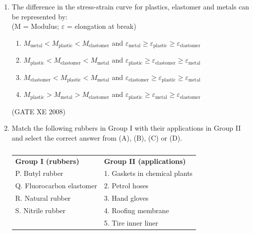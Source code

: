\documentclass[12pt]{article}
\begin{document}
\begin{enumerate}
\begin{enumerate}
\end{enumerate}

(GATE XE 2008)

\item The difference in the stress-strain curve for plastics, elastomer and metals can be represented by: \\
(M = Modulus; $\varepsilon$ = elongation at break)

\begin{enumerate}
\item  $M_{\text{metal}} < M_{\text{plastic}} < M_{\text{elastomer}}$ and $\varepsilon_{\text{metal}} \geq \varepsilon_{\text{plastic}} \geq \varepsilon_{\text{elastomer}}$ 
\item  $M_{\text{plastic}} < M_{\text{elastomer}} < M_{\text{metal}}$ and $\varepsilon_{\text{plastic}} \geq \varepsilon_{\text{elastomer}} \geq \varepsilon_{\text{metal}}$ 
\item  $M_{\text{elastomer}} < M_{\text{plastic}} < M_{\text{metal}}$ and $\varepsilon_{\text{elastomer}} \geq \varepsilon_{\text{plastic}} \geq \varepsilon_{\text{metal}}$ 
\item  $M_{\text{plastic}} > M_{\text{metal}} > M_{\text{elastomer}}$ and $\varepsilon_{\text{plastic}} \geq \varepsilon_{\text{metal}} \geq \varepsilon_{\text{elastomer}}$
\end{enumerate}

(GATE XE 2008)

\item Match the following rubbers in Group I with their applications in Group II and select the correct answer from (A), (B), (C) or (D).

\begin{table}[H]     \centering     \caption{}     \label{}     \begin{tabular}{l l}
\textbf{Group I (rubbers)} & \textbf{Group II (applications)} \\
P. Butyl rubber & 1. Gaskets in chemical plants \\
Q. Fluorocarbon elastomer & 2. Petrol hoses \\
R. Natural rubber & 3. Hand gloves \\
S. Nitrile rubber & 4. Roofing membrane \\
& 5. Tire inner liner \\
\end{tabular} \end{table}


\end{enumerate}
\end{document}
